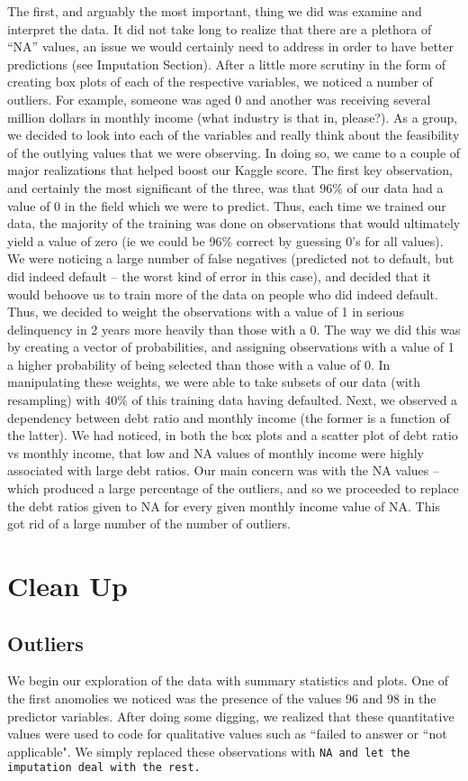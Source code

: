 \documentclass[11pt, oneside]{article}   	%
\begin{document}
The first, and arguably the most important, thing we did was examine and interpret the data. It did not take long to realize that there are a plethora of “NA” values, an issue we would certainly need to address in order to have better predictions (see Imputation Section). After a little more scrutiny in the form of creating box plots of each of the respective variables, we noticed a number of outliers. For example, someone was aged 0 and another was receiving several million dollars in monthly income (what industry is that in, please?). As a group, we decided to look into each of the variables and really think about the feasibility of the outlying values that we were observing. In doing so, we came to a couple of major realizations that helped boost our Kaggle score. 
The first key observation, and certainly the most significant of the three, was that 96\% of our data had a value of 0 in the field which we were to predict. Thus, each time we trained our data, the majority of the training was done on observations that would ultimately yield a value of zero (ie we could be 96\% correct by guessing 0’s for all values). We were noticing a large number of false negatives (predicted not to default, but did indeed default – the worst kind of error in this case), and decided that it would behoove us to train more of the data on people who did indeed default. Thus, we decided to weight the observations with a value of 1 in serious delinquency in 2 years more heavily than those with a 0. The way we did this was by creating a vector of probabilities, and assigning observations with a value of 1 a higher probability of being selected than those with a value of 0. In manipulating these weights, we were able to take subsets of our data (with resampling) with 40\% of this training data having defaulted. 
Next, we observed a dependency between debt ratio and monthly income (the former is a function of the latter). We had noticed, in both the box plots and a scatter plot of debt ratio vs monthly income, that low and NA values of monthly income were highly associated with large debt ratios. Our main concern was with the NA values – which produced a large percentage of the outliers, and so we proceeded to replace the debt ratios given to NA for every given monthly income value of NA. This got rid of a large number of the number of outliers.

\section{Clean Up}
	\subsection{Outliers}
	We begin our exploration of the data with summary statistics and plots. One of 
	the first anomolies we noticed was the presence of the values $96$ and $98$ 
	in the predictor variables. After doing some digging, we realized that 
	these quantitative values were used to code for qualitative values such as 
	``failed to answer or ``not applicable". We simply replaced these observations with
	\tt NA\rm~and let the imputation deal with the rest.
	
\end{document}
